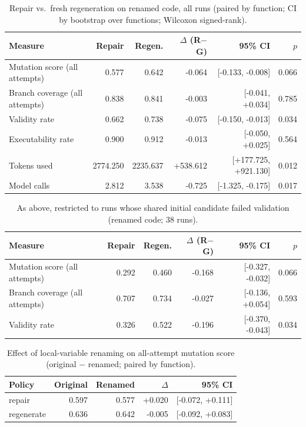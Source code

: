 \begin{table}[t]
\centering\small
\caption{Repair vs.\ fresh regeneration on renamed code, all runs (paired by function; CI by bootstrap over functions; Wilcoxon signed-rank).}
\label{tab:main-renamed}
\begin{tabular}{lrrrrr}
\toprule
Measure & Repair & Regen. & $\Delta$ (R$-$G) & 95\% CI & $p$ \\
\midrule
Mutation score (all attempts) & 0.577 & 0.642 & -0.064 & [-0.133, -0.008] & 0.066 \\
Branch coverage (all attempts) & 0.838 & 0.841 & -0.003 & [-0.041, +0.034] & 0.785 \\
Validity rate & 0.662 & 0.738 & -0.075 & [-0.150, -0.013] & 0.034 \\
Executability rate & 0.900 & 0.912 & -0.013 & [-0.050, +0.025] & 0.564 \\
Tokens used & 2774.250 & 2235.637 & +538.612 & [+177.725, +921.130] & 0.012 \\
Model calls & 2.812 & 3.538 & -0.725 & [-1.325, -0.175] & 0.017 \\
\bottomrule
\end{tabular}
\end{table}

\begin{table}[t]
\centering\small
\caption{As above, restricted to runs whose shared initial candidate failed validation (renamed code; 38 runs).}
\label{tab:fail-renamed}
\begin{tabular}{lrrrrr}
\toprule
Measure & Repair & Regen. & $\Delta$ (R$-$G) & 95\% CI & $p$ \\
\midrule
Mutation score (all attempts) & 0.292 & 0.460 & -0.168 & [-0.327, -0.032] & 0.066 \\
Branch coverage (all attempts) & 0.707 & 0.734 & -0.027 & [-0.136, +0.054] & 0.593 \\
Validity rate & 0.326 & 0.522 & -0.196 & [-0.370, -0.043] & 0.034 \\
\bottomrule
\end{tabular}
\end{table}

\begin{table}[t]
\centering\small
\caption{Effect of local-variable renaming on all-attempt mutation score (original $-$ renamed; paired by function).}
\label{tab:rename}
\begin{tabular}{lrrrr}
\toprule
Policy & Original & Renamed & $\Delta$ & 95\% CI \\
\midrule
repair & 0.597 & 0.577 & +0.020 & [-0.072, +0.111] \\
regenerate & 0.636 & 0.642 & -0.005 & [-0.092, +0.083] \\
\bottomrule
\end{tabular}
\end{table}

